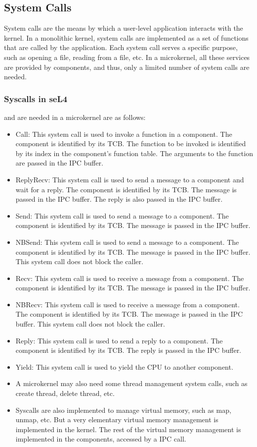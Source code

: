 \documentclass[
	a4paper, %
	11pt, %
	unnumberedsections, %
	twoside, %
]{LTJournalArticle}
\begin{document}
\subsection{System Calls}

System calls are the means by which a user-level application interacts with the kernel. In a monolithic kernel, system calls are implemented as a set of functions that are called by the application. Each system call serves a specific purpose, such as opening a file, reading from a file, etc. In a microkernel, all these services are provided by components, and thus, only a limited number of system calls are needed.

\subsubsection{Syscalls in seL4} and are needed in a microkernel are as follows:
\begin{itemize}
	\item Call: This system call is used to invoke a function in a component. The component is identified by its TCB. The function to be invoked is identified by its index in the component's function table. The arguments to the function are passed in the IPC buffer.
	\item ReplyRecv: This system call is used to send a message to a component and wait for a reply. The component is identified by its TCB. The message is passed in the IPC buffer. The reply is also passed in the IPC buffer.
	\item Send: This system call is used to send a message to a component. The component is identified by its TCB. The message is passed in the IPC buffer.
	\item NBSend: This system call is used to send a message to a component. The component is identified by its TCB. The message is passed in the IPC buffer. This system call does not block the caller.
	\item Recv: This system call is used to receive a message from a component. The component is identified by its TCB. The message is passed in the IPC buffer.
	\item NBRecv: This system call is used to receive a message from a component. The component is identified by its TCB. The message is passed in the IPC buffer. This system call does not block the caller.
	\item Reply: This system call is used to send a reply to a component. The component is identified by its TCB. The reply is passed in the IPC buffer.
	\item Yield: This system call is used to yield the CPU to another component.
	\item A microkernel may also need some thread management system calls, such as create thread, delete thread, etc.
	\item Syscalls are also implemented to manage virtual memory, such as map, unmap, etc. But a very elementary virtual memory management is implemented in the kernel. The rest of the virtual memory management is implemented in the components, accessed by a IPC call.
\end{itemize}
\end{document}
